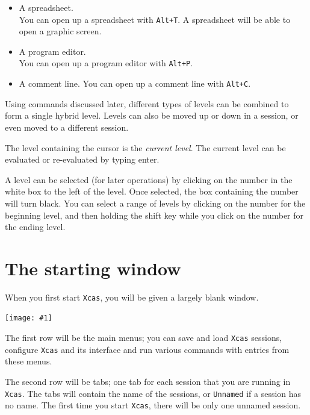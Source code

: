\documentclass[a4paper,11pt]{book}
\newcommand{\includeimage}[1]
{\texttt{[image: \#1]}}
\begin{document}
\begin{itemize}
  \item A spreadsheet.\\
  You can open up a spreadsheet with \texttt{Alt+T}.
  A spreadsheet will be able to open a graphic screen.
  
  \item A program editor.\\
  You can open up a program editor with
  \texttt{Alt+P}.
  
  \item A comment line.  You can open up a comment line with
  \texttt{Alt+C}.
\end{itemize}
Using commands discussed later, different types of levels can be
combined to form a single hybrid level.  Levels can also be moved up
or down in a session, or even moved to a different session.

The level containing the cursor is the \emph{current level}.  The
current level can be evaluated or re-evaluated by typing enter.

A level can be selected (for later operations) by clicking on the
number in the white box to the left of the level.  Once selected, the
box containing the number will turn black.  You can select a range of
levels by clicking on the number for the beginning level, and then
holding the shift key while you click on the number for the ending level.

\section{The starting window}

When you first start \texttt{Xcas}, you will be given a largely blank window.
\begin{center}
  \includeimage{xcas-open.png}
\end{center}
The first row will be the main menus; you can 
save and load \texttt{Xcas} sessions, configure \texttt{Xcas} and its
interface and run various commands with entries from these menus.

The second row will be tabs; one tab for each session that you are
running in \texttt{Xcas}.  The tabs will contain the name of the
sessions, or \texttt{Unnamed} if a session has no name.  The first
time you start \texttt{Xcas}, there will be only one unnamed session.
\end{document}

